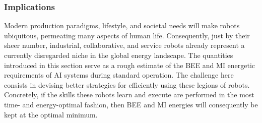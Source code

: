 \subsubsection{Implications}
Modern production paradigms, lifestyle, and societal needs will make robots ubiquitous, permeating many aspects of human life. Consequently, just by their sheer number, industrial, collaborative, and service robots already represent a currently disregarded niche in the global energy landscape. The quantities introduced in this section serve as a rough estimate of the BEE and MI energetic requirements of AI systems during standard operation. The challenge here consists in devising better strategies for efficiently using these legions of robots. Concretely, if the skills these robots learn and execute are performed in the most time- and energy-optimal fashion, then BEE and MI energies will consequently be kept at the optimal minimum.
